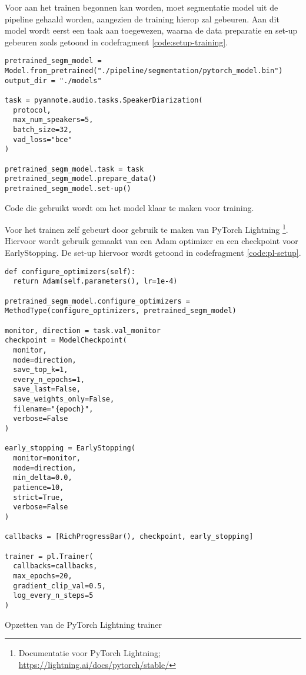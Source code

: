 Voor aan het trainen begonnen kan worden, moet segmentatie model uit de pipeline gehaald worden, aangezien de training hierop zal gebeuren. Aan dit model wordt eerst een taak aan toegewezen, waarna de data preparatie en set-up gebeuren zoals getoond in codefragment \ref{code:setup-training}.

\begin{listing}
	\begin{verbatim}
pretrained_segm_model = Model.from_pretrained("./pipeline/segmentation/pytorch_model.bin")
output_dir = "./models"

task = pyannote.audio.tasks.SpeakerDiarization(
  protocol,
  max_num_speakers=5,
  batch_size=32,
  vad_loss="bce"
)

pretrained_segm_model.task = task
pretrained_segm_model.prepare_data()
pretrained_segm_model.set-up()
	\end{verbatim}
	\caption[Model klaarmaken voor training]{\label{code:setup-training}Code die gebruikt wordt om het model klaar te maken voor training.}
\end{listing}

Voor het trainen zelf gebeurt door gebruik te maken van PyTorch Lightning \footnote{Documentatie voor PyTorch Lightning; \url{https://lightning.ai/docs/pytorch/stable/}}. Hiervoor wordt gebruik gemaakt van een Adam optimizer en een checkpoint voor EarlyStopping. De set-up hiervoor wordt getoond in codefragment \ref{code:pl-setup}.

\begin{listing}
	\begin{verbatim}
def configure_optimizers(self):
  return Adam(self.parameters(), lr=1e-4)
  
pretrained_segm_model.configure_optimizers = MethodType(configure_optimizers, pretrained_segm_model)

monitor, direction = task.val_monitor
checkpoint = ModelCheckpoint(
  monitor,
  mode=direction,
  save_top_k=1,
  every_n_epochs=1,
  save_last=False,
  save_weights_only=False,
  filename="{epoch}",
  verbose=False
)

early_stopping = EarlyStopping(
  monitor=monitor,
  mode=direction,
  min_delta=0.0,
  patience=10,
  strict=True,
  verbose=False
)

callbacks = [RichProgressBar(), checkpoint, early_stopping]

trainer = pl.Trainer(
  callbacks=callbacks,
  max_epochs=20,
  gradient_clip_val=0.5,
  log_every_n_steps=5
)
	\end{verbatim}
	\caption[PyTorch Lightning set-up]{\label{code:pl-setup}Opzetten van de PyTorch Lightning trainer}
\end{listing}

